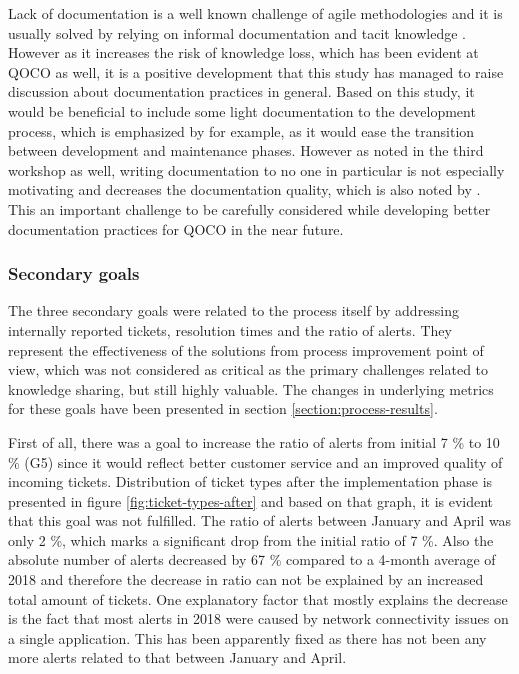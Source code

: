 Lack of documentation is a well known challenge of agile methodologies and it is usually solved by relying on informal documentation and tacit knowledge \citep{Basri2011}\citep{Ersoy2015}\citep{Stettina2013}.
However as it increases the risk of knowledge loss, which has been evident at QOCO as well, it is a positive development that this study has managed to raise discussion about documentation practices in general.
Based on this study, it would be beneficial to include some light documentation to the development process, which is emphasized by \citet{Stettina2013} for example, as it would ease the transition between
development and maintenance phases. However as noted in the third workshop as well, writing documentation to no one in particular is not especially motivating and decreases the documentation quality, which is
also noted by \citet{Stettina2013}. This an important challenge to be carefully considered while developing better documentation practices for QOCO in the near future.

\subsubsection*{Secondary goals}

The three secondary goals were related to the process itself by addressing internally reported tickets, resolution times and the ratio of alerts. They represent the effectiveness of the solutions from process
improvement point of view, which was not considered as critical as the primary challenges related to knowledge sharing, but still highly valuable. The changes in underlying metrics for these goals have been
presented in section \ref{section:process-results}.

First of all, there was a goal to increase the ratio of alerts from initial 7 \% to 10 \% (G5) since it would reflect better customer service and an improved quality of incoming tickets. Distribution of ticket types after
the implementation phase is presented in figure \ref{fig:ticket-types-after} and based on that graph, it is evident that this goal was not fulfilled. The ratio of alerts between January and April was only 2 \%,
which marks a significant drop from the initial ratio of 7 \%. Also the absolute number of alerts decreased by 67 \% compared to a 4-month average of 2018 and therefore the decrease in ratio can not be explained
by an increased total amount of tickets. One explanatory factor that mostly explains the decrease is the fact that most alerts in 2018 were caused by network connectivity issues on a single application. This has been
apparently fixed as there has not been any more alerts related to that between January and April.

